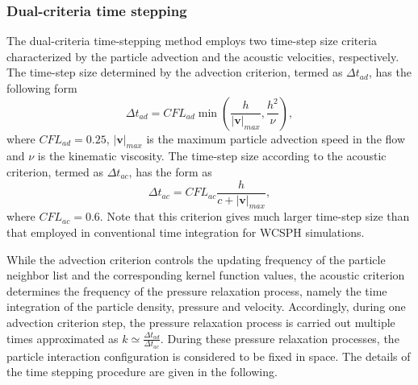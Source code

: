 \documentclass[12pt, a4paper,onecolumn]{article}
\begin{document}
\subsubsection{Dual-criteria time stepping}
\label{sectimescheme}
The dual-criteria time-stepping method employs two time-step size criteria 
characterized by the particle advection and the acoustic velocities, respectively.
The time-step size determined by the advection criterion, 
termed as $\Delta t_{ad}$, 
has the following form
%
\begin{equation}\label{dt-advection}
\Delta t_{ad}   =  {CFL}_{ad} \min\left(\frac{h}{|\mathbf{v}|_{max}}, \frac{h^2}{\nu}\right),
\end{equation}
%
where $CFL_{ad} = 0.25$, 
$|\mathbf{v}|_{max}$ is the maximum particle advection speed in the flow 
and $\nu$ is the kinematic viscosity.
The time-step size according to the acoustic criterion, 
termed as $\Delta t_{ac}$, 
has the form as
\begin{equation}\label{dt-relax}
\Delta t_{ac}   = {CFL}_{ac} \frac{h}{c + |\mathbf{v}|_{max}},
\end{equation}
where ${CFL}_{ac} = 0.6$. 
Note that this criterion gives much larger time-step size
than that employed in conventional time integration for WCSPH simulations.

While the advection criterion controls the updating frequency of the particle neighbor list 
and the corresponding kernel function values,
the acoustic criterion determines the frequency of the pressure relaxation process, 
namely the time integration of the particle density, pressure and velocity.
Accordingly, 
during one advection criterion step, 
the pressure relaxation process is carried out multiple times approximated as $k \simeq \frac{\Delta t_{ad}}{\Delta t_{ac}} $.
During these pressure relaxation processes, the particle interaction configuration is considered to be fixed in space.
The details of the time stepping procedure are given in the following.
\end{document}
